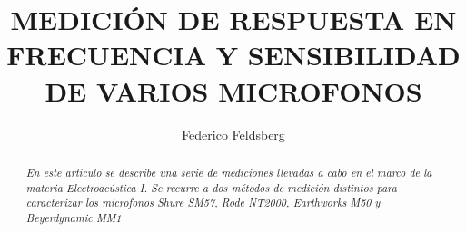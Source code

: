 \documentclass[]{article}
\title{\textbf{\LARGE{\textsf{MEDICIÓN DE RESPUESTA EN FRECUENCIA Y
 SENSIBILIDAD DE VARIOS MICROFONOS}}}}
\date{} %
\begin{document}


\renewcommand{\headrulewidth}{0pt} %


\author[1]{Federico Feldsberg} %


\begin{minipage}[h]{\textwidth} %
    \maketitle
    \thispagestyle{fancy}
    \fancyhf{}
    \cfoot{\thepage}

\end{minipage}


\begin{abstract}
\textit{En este artículo se describe una serie de mediciones llevadas a cabo
en el marco de la materia Electroacústica I. Se recurre a dos métodos
de medición distintos para caracterizar los microfonos Shure SM57,
Rode NT2000, Earthworks M50 y Beyerdynamic MM1}
\end{abstract}
\end{document}
